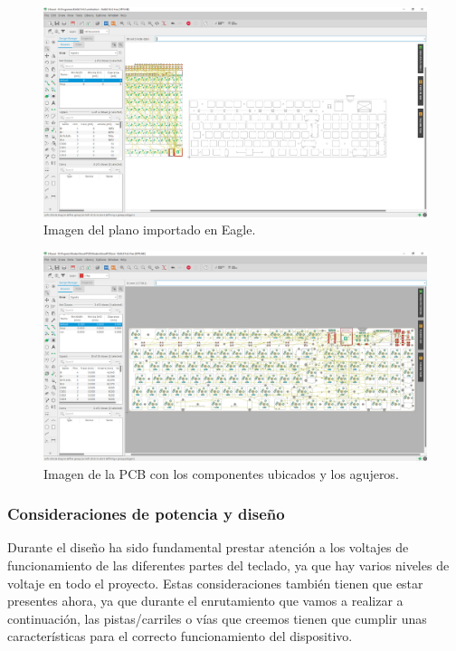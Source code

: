\begin{figure}[H]
    \centering
    \includegraphics[width=1\textwidth]{imagenes/Capitulos/Cap05/EaglePCBPlano.png}
    \caption{Imagen del plano importado en Eagle.}
    \label{fig:EaglePCBPlano}
\end{figure}

\begin{figure}[H]
    \centering
    \includegraphics[width=1\textwidth]{imagenes/Capitulos/Cap05/EaglePCBPartesColocadas.png}
    \caption{Imagen de la \gls{PCB} con los componentes ubicados y los agujeros.}
    \label{fig:EaglePCBPartesColocadas}
\end{figure}
\newpage
\subsubsection{Consideraciones de potencia y diseño}
Durante el diseño ha sido fundamental prestar atención a los voltajes de funcionamiento de las diferentes partes del teclado, ya que hay varios niveles de voltaje en todo el proyecto. Estas consideraciones también tienen que estar presentes ahora, ya que durante el enrutamiento que vamos a realizar a continuación, las pistas/carriles o vías que creemos tienen que cumplir unas características para el correcto funcionamiento del dispositivo.

